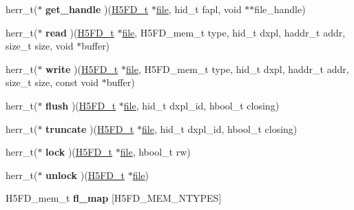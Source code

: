 \begin{DoxyCompactItemize}
\item 
\mbox{\label{struct_h5_f_d__class__t_aaff542d014788e82292038d71a2e8c0a}} 
herr\+\_\+t($\ast$ {\bfseries get\+\_\+handle} )(\hyperlink{struct_h5_f_d__t}{H5\+F\+D\+\_\+t} $\ast$\hyperlink{structfile}{file}, hid\+\_\+t fapl, void $\ast$$\ast$file\+\_\+handle)
\item 
\mbox{\label{struct_h5_f_d__class__t_ade9f8cbc3464b91a8b04565ee3b372d0}} 
herr\+\_\+t($\ast$ {\bfseries read} )(\hyperlink{struct_h5_f_d__t}{H5\+F\+D\+\_\+t} $\ast$\hyperlink{structfile}{file}, H5\+F\+D\+\_\+mem\+\_\+t type, hid\+\_\+t dxpl, haddr\+\_\+t addr, size\+\_\+t size, void $\ast$buffer)
\item 
\mbox{\label{struct_h5_f_d__class__t_ad0504cce8ee08e2b6360881a8da2eb91}} 
herr\+\_\+t($\ast$ {\bfseries write} )(\hyperlink{struct_h5_f_d__t}{H5\+F\+D\+\_\+t} $\ast$\hyperlink{structfile}{file}, H5\+F\+D\+\_\+mem\+\_\+t type, hid\+\_\+t dxpl, haddr\+\_\+t addr, size\+\_\+t size, const void $\ast$buffer)
\item 
\mbox{\label{struct_h5_f_d__class__t_afc85d7a19fa58bc1b206c804bdcbd895}} 
herr\+\_\+t($\ast$ {\bfseries flush} )(\hyperlink{struct_h5_f_d__t}{H5\+F\+D\+\_\+t} $\ast$\hyperlink{structfile}{file}, hid\+\_\+t dxpl\+\_\+id, hbool\+\_\+t closing)
\item 
\mbox{\label{struct_h5_f_d__class__t_a6e7ac2b2f3913f8aa32f110e1cf12d47}} 
herr\+\_\+t($\ast$ {\bfseries truncate} )(\hyperlink{struct_h5_f_d__t}{H5\+F\+D\+\_\+t} $\ast$\hyperlink{structfile}{file}, hid\+\_\+t dxpl\+\_\+id, hbool\+\_\+t closing)
\item 
\mbox{\label{struct_h5_f_d__class__t_a4f30c747560f420ec6a6579fc019363b}} 
herr\+\_\+t($\ast$ {\bfseries lock} )(\hyperlink{struct_h5_f_d__t}{H5\+F\+D\+\_\+t} $\ast$\hyperlink{structfile}{file}, hbool\+\_\+t rw)
\item 
\mbox{\label{struct_h5_f_d__class__t_ad56beef98b7f0bdedf0fb77e0a4533bb}} 
herr\+\_\+t($\ast$ {\bfseries unlock} )(\hyperlink{struct_h5_f_d__t}{H5\+F\+D\+\_\+t} $\ast$\hyperlink{structfile}{file})
\item 
\mbox{\label{struct_h5_f_d__class__t_a5b76f9167b4966cde10412006f5524b1}} 
H5\+F\+D\+\_\+mem\+\_\+t {\bfseries fl\+\_\+map} \mbox{[}H5\+F\+D\+\_\+\+M\+E\+M\+\_\+\+N\+T\+Y\+P\+ES\mbox{]}
\end{DoxyCompactItemize}


